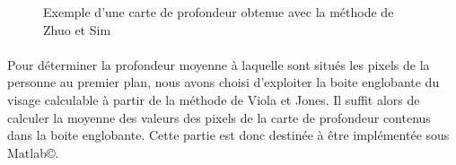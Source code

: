 \documentclass[11pt, french,screen]{report-rd-info}
\begin{document}
\begin{figure}[htp]
 \centering
 \caption{Exemple d'une carte de profondeur obtenue avec la méthode de Zhuo et Sim \cite{Zhuo2011}}
 \label{fig:DefocusExemple}
\end{figure}


\paragraph*{}
Pour déterminer la profondeur moyenne à laquelle sont situés les pixels de la personne au premier plan, nous avons choisi d'exploiter la boite englobante du visage calculable à partir de la méthode de Viola et Jones. Il suffit alors de calculer la moyenne des valeurs des pixels de la carte de profondeur contenus dans la boite englobante. Cette partie est donc destinée à être implémentée sous Matlab\copyright.
\end{document}
